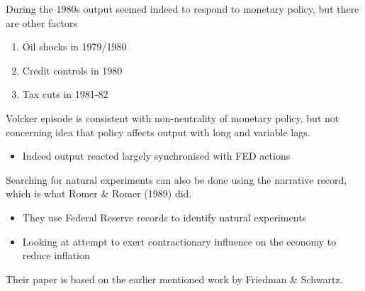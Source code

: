 \documentclass{beamer}
\begin{document}
\begin{frame}
  During the 1980s output seemed indeed to respond to monetary policy, but there are other factors
  \begin{enumerate}
    \item Oil shocks in 1979/1980
    \item Credit controls in 1980
    \item Tax cuts in 1981-82
  \end{enumerate}
  \medskip
  Volcker episode is consistent with non-neutrality of monetary policy, but not concerning idea that policy affects output with long and variable lags.
  \begin{itemize}
    \item Indeed output reacted largely synchronised with FED actions
  \end{itemize}  
\end{frame}

\begin{frame}
  Searching for natural experiments can also be done using the narrative record, which is what Romer \& Romer (1989) did.
  \begin{itemize}
    \item They use Federal Reserve records to identify natural experiments
    \item Looking at attempt to exert contractionary influence on the economy to reduce inflation
  \end{itemize}
  \medskip
  Their paper is based on the earlier mentioned work by Friedman \& Schwartz.
\end{frame}
\end{document}
